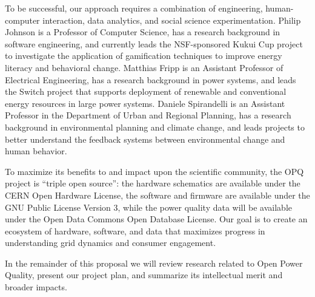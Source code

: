 To be successful, our approach requires a combination of engineering, human-computer interaction, data analytics, and social science experimentation.  Philip Johnson is a Professor of Computer Science, has a research background in software engineering, and currently leads the NSF-sponsored Kukui Cup project \cite{kukuicup} to investigate the application of gamification techniques to improve energy literacy and behavioral change. Matthias Fripp is an Assistant Professor of Electrical Engineering, has a research background in power systems, and leads the Switch project \cite{switch} that supports deployment of renewable and conventional energy resources in large power systems. Daniele Spirandelli is an Assistant Professor in the Department of Urban and Regional Planning, has a research background in environmental planning and climate change, and leads projects to better understand the feedback systems between environmental change and human behavior. 

To maximize its benefits to and impact upon the scientific community, the OPQ project is ``triple open source'': the hardware schematics are available under the CERN Open Hardware License, the software and firmware are available under the GNU Public License Version 3, while the power quality data will be available under the Open Data Commons Open Database License.  Our goal is to create an ecosystem of hardware, software, and data that maximizes progress in understanding grid dynamics and consumer engagement.


In the remainder of this proposal we will review research related to Open Power Quality, present our project plan, and summarize its intellectual merit and broader impacts.



